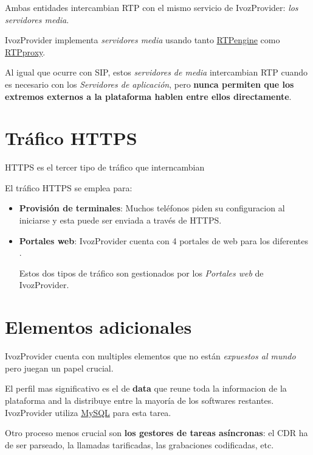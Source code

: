 \documentclass[letterpaper,10pt,spanish]{sphinxmanual}
\begin{document}
Ambas entidades intercambian RTP con el mismo servicio de IvozProvider: \emph{los servidores media}.

IvozProvider implementa \emph{servidores media} usando tanto \href{https://github.com/sipwise/rtpengine}{RTPengine} como \href{http://www.rtpproxy.org/}{RTPproxy}.

Al igual que ocurre con SIP, estos \emph{servidores de media} intercambian RTP cuando es necesario con los \emph{Servidores de aplicación}, pero \textbf{nunca permiten que los extremos externos a la plataforma hablen entre ellos directamente}.


\section{Tráfico HTTPS}
\label{architecture/index:https-traffic}
HTTPS es el tercer tipo de tráfico que interncambian

El tráfico HTTPS se emplea para:
\begin{itemize}
\item {} 
\textbf{Provisión de terminales}: Muchos teléfonos piden su configuracion al iniciarse y esta puede ser enviada a través de HTTPS.

\item {} 
\textbf{Portales web}: IvozProvider cuenta con 4 portales de web para los diferentes {\hyperref[operation_roles/index:operation\string-roles]{}}.

Estos dos tipos de tráfico son gestionados por los \emph{Portales web} de IvozProvider.

\end{itemize}


\section{Elementos adicionales}
\label{architecture/index:additional-elements}
IvozProvider cuenta con multiples elementos que no están \emph{expuestos al mundo} pero juegan un papel crucial.

El perfil mas significativo es el de \textbf{data} que reune toda la informacion de la plataforma and la distribuye entre la mayoría de los softwares restantes. IvozProvider utiliza \href{https://www.mysql.com/}{MySQL} para esta tarea.

Otro proceso menos crucial son \textbf{los gestores de tareas asíncronas}: el CDR ha de ser parseado, la llamadas tarificadas, las grabaciones codificadas, etc.
\end{document}

